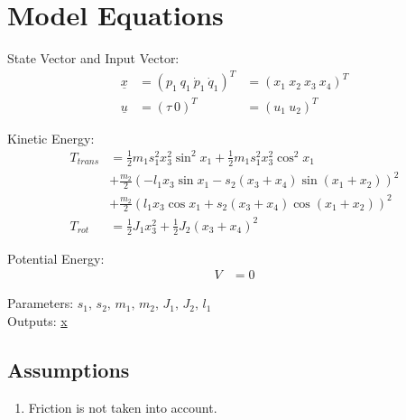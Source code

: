 \documentclass[10pt,a4paper]{article}
\begin{document}
	
	\section{Model Equations} %
	
	State Vector and Input Vector:
	\begin{align*}
		\underline{x} &= (p_1 \ q_1 \ \dot{p}_1 \ \dot{q}_1)^T &= (x_1 \ x_2 \ x_3 \ x_4)^T \\
		\underline{u} &= (\tau \ 0)^T &= (u_1 \ u_2)^T 
	\end{align*}
	
	\noindent Kinetic Energy:			
	\begin{subequations}
	\begin{align*}
		T_{trans} &= \frac{1}{2} m_1s_1^2x_3^2 \sin^2 x_1+ \frac{1}{2} m_1s_1^2x_3^2 \cos^2 x_1 \\
		&+ \frac{m_2}{2}(-l_1x_3 \sin x_1 - s_2(x_3 + x_4) \sin(x_1 + x_2))^2 \\
		&+ \frac{m_2}{2}(l_1x_3 \cos x_1 + s_2(x_3 + x_4) \cos(x_1 + x_2))^2 \\
		T_{rot} &= \frac{1}{2} J_1x_3^2 + \frac{1}{2} J_2(x_3 + x_4)^2	
	\end{align*}
	\end{subequations}
		
	
	\noindent Potential Energy:			
	\begin{subequations}
	\begin{align*}
		V &= 0
	\end{align*}
	\end{subequations}

	\noindent
	Parameters: $s_1, \, s_2, \, m_1, \, m_2, \, J_1, \, J_2, \, l_1$ %
	\\
	Outputs: \underline{x} %
	
	
	\subsection{Assumptions} %
		\begin{enumerate} %
			\item Friction is not taken into account. 
		\end{enumerate}
	
\end{document}
